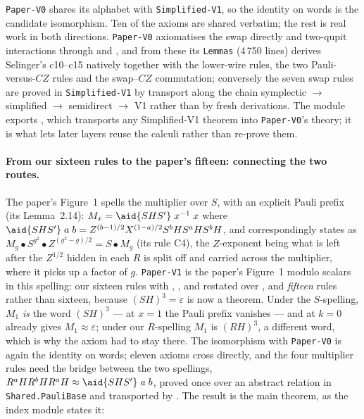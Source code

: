 \texttt{Paper-V0} shares its alphabet with \texttt{Simplified-V1}, so
the identity on words is the candidate isomorphism.  Ten of the axioms
are shared verbatim; the rest is real work in both
directions.  \texttt{Paper-V0} axiomatises the swap directly and
two-qupit interactions through  and
, and from these its \texttt{Lemmas} (4\,750 lines)
derives Selinger's c10--c15 natively together with the lower-wire
rules, the two Pauli-versus-$CZ$ rules and the swap--$CZ$ commutation;
conversely the seven swap rules are proved in \texttt{Simplified-V1} by
transport along the chain symplectic $\to$ simplified $\to$ semidirect
$\to$ V1 rather than by fresh derivations.  The module exports , which
transports any Simplified-V1 theorem into \texttt{Paper-V0}'s theory;
it is what lets later layers reuse the calculi rather than re-prove
them.

\paragraph{From our sixteen rules to the paper's fifteen: connecting
the two routes.}  The paper's Figure~1 spells the multiplier over
$S$, with an explicit Pauli prefix (its Lemma~2.14): $M_x =
\aid{SHS'}\;x^{-1}\;x$ where $\aid{SHS'}\;a\;b = Z^{(b-1)/2}
X^{(1-a)/2} S^{b} H S^{a} H S^{b} H$, and correspondingly states
 as
$M_g \bullet S^{g^2} \bullet Z^{(g^2-g)/2} = S \bullet M_g$ (its rule
C4), the $Z$-exponent being what is left after the $Z^{1/2}$ hidden in
each $R$ is split off and carried across the multiplier, where it picks
up a factor of $g$.  \texttt{Paper-V1} is the paper's Figure~1 modulo scalars in
this spelling: our sixteen rules with ,
,  and  restated over
, and \emph{fifteen} rules rather than sixteen, because
$(SH)^3 = \varepsilon$ is now a theorem.
Under the $S$-spelling, $M_1$ \emph{is} the word $(SH)^3$ --- at $x = 1$
the Pauli prefix vanishes --- and  at $k = 0$ already
gives $M_1 \approx \varepsilon$; under our $R$-spelling $M_1$ is
$(RH)^3$, a different word, which is why the axiom had to stay there.
The isomorphism with \texttt{Paper-V0} is again the identity on words;
eleven axioms cross directly, and the four multiplier rules need the
bridge between the two spellings, $R^{a}HR^{b}HR^{a}H \approx
\aid{SHS'}\;a\;b$, proved once over an abstract relation in
\texttt{Shared.PauliBase} and transported by .  The result
is the main theorem, as the index module states it:

